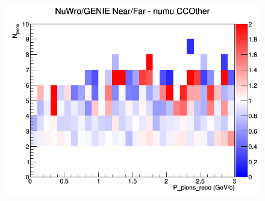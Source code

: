 \documentclass[12pt]{article}
\begin{document}
\begin{figure}[h]
\endminipage
{}
\includegraphics[width=\linewidth]{eff_N_P/FGT/pions/ratios/CCOther_NuWro_GENIE_numu_NF_N_P.png}
\endminipage
\newline
\end{figure}
\clearpage
\end{document}
